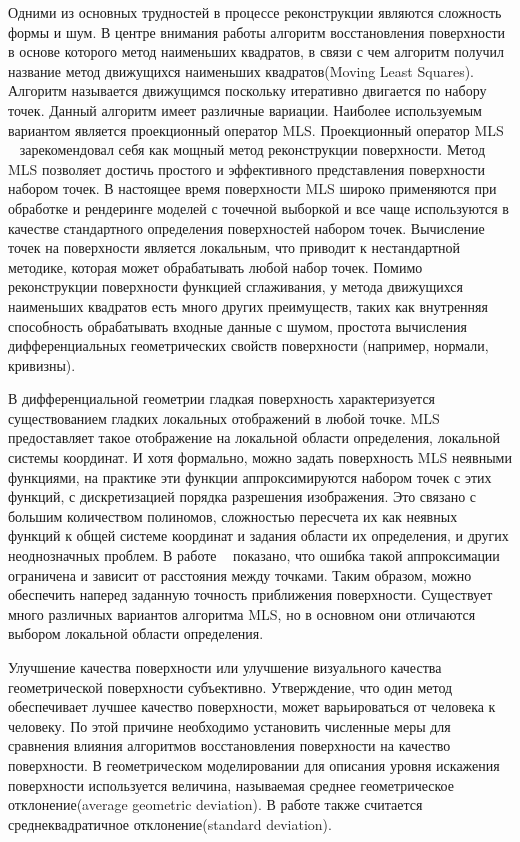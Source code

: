 Одними из основных трудностей в процессе реконструкции являются сложность формы и шум. В центре внимания работы алгоритм восстановления поверхности в основе которого метод наименьших квадратов, в связи с чем алгоритм получил название метод движущихся наименьших квадратов(Moving Least Squares). Алгоритм называется движущимся поскольку итеративно двигается по набору точек. Данный алгоритм имеет различные вариации. Наиболее используемым вариантом является проекционный оператор MLS. Проекционный оператор MLS ~\cite{LEVIN} зарекомендовал себя как мощный метод реконструкции поверхности. 
Метод MLS позволяет достичь простого и эффективного представления поверхности набором точек. В настоящее время поверхности MLS широко применяются при обработке и рендеринге моделей с точечной выборкой и все чаще используются в качестве стандартного определения поверхностей набором точек.  Вычисление точек на поверхности является локальным, что приводит к нестандартной методике, которая может обрабатывать любой набор точек. Помимо реконструкции поверхности функцией сглаживания, у метода движущихся наименьших квадратов есть много других преимуществ, таких как внутренняя способность обрабатывать входные данные с шумом, простота вычисления дифференциальных геометрических свойств поверхности (например, нормали, кривизны).

В дифференциальной геометрии гладкая поверхность характеризуется существованием гладких локальных отображений в любой точке.  MLS предоставляет такое отображение на локальной области определения, локальной системы координат. И хотя формально, можно задать поверхность MLS неявными функциями, на практике эти функции аппроксимируются набором точек с этих функций, с дискретизацией порядка разрешения изображения. Это связано с большим количеством полиномов, сложностью пересчета их как неявных функций к общей системе координат и задания области их определения, и других неоднозначных проблем. В работе ~\cite{LEVIN} показано, что ошибка такой аппроксимации ограничена и зависит от расстояния между точками. Таким образом, можно обеспечить наперед заданную точность приближения поверхности. Существует много различных вариантов алгоритма MLS, но в основном они отличаются выбором локальной области определения.

Улучшение качества поверхности или улучшение визуального качества геометрической поверхности субъективно. Утверждение, что один метод обеспечивает лучшее качество поверхности, может варьироваться от человека к человеку. По этой причине необходимо установить численные меры для сравнения влияния алгоритмов восстановления поверхности на качество поверхности.
В геометрическом моделировании для описания уровня искажения поверхности используется величина, называемая среднее геометрическое отклонение(average geometric deviation). В работе также считается среднеквадратичное отклонение(standard deviation).




